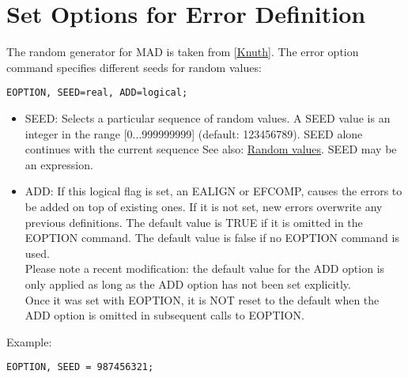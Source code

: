 
\section{Set Options for Error Definition} %
\label{sec:error_option}
The random generator for MAD is taken from
\href{../Introduction/bibliography.html#knuth}{[Knuth]}. The error
option command specifies different seeds for random values:  

\begin{verbatim}
EOPTION, SEED=real, ADD=logical;
\end{verbatim}

\begin{itemize}
   \item SEED: Selects a particular sequence of random values. A SEED
     value is an integer in the range [0...999999999] (default:
     123456789). SEED alone continues with the current sequence See
     also: \href{../Introduction/expression.html#random}{Random
       values}. SEED may be an expression.  
   \item ADD: If this logical flag is set, an EALIGN or EFCOMP, causes
     the errors to be added on top of existing ones. If it is not set,
     new errors overwrite any previous definitions. The default value is
     TRUE if it is omitted in the EOPTION command. The default value is
     false if no EOPTION command is used.  
\\Please note a recent modification: the default value for the ADD
option is only applied as long as the ADD option has not been set
explicitly. 
\\Once it was set with EOPTION, it is NOT reset to the default when
the ADD option is omitted in subsequent calls to EOPTION.  
\end{itemize} 

Example: 
\begin{verbatim}
EOPTION, SEED = 987456321;
\end{verbatim}

